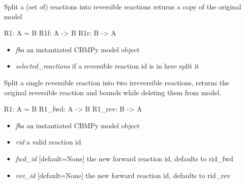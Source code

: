 \documentclass[a4paper,11pt,english]{sphinxmanual}
\begin{document}
\begin{fulllineitems}
\label{modules_doc:cbmpy.CBTools.splitReversibleReactions}
Split a (set of) reactions into reversible reactions returns a copy of the original model

R1: A = B
R1f: A -\textgreater{} B
R1r: B -\textgreater{} A
\begin{itemize}
\item {} 
\emph{fba} an instantiated CBMPy model object

\item {} 
\emph{selected\_reactions} if a reversible reaction id is in here split it

\end{itemize}

\end{fulllineitems}


\begin{fulllineitems}
\label{modules_doc:cbmpy.CBTools.splitSingleReversibleReaction}
Split a single reversible reaction into two irreversible reactions, returns the original reversible reaction and bounds
while deleting them from model.

R1: A = B
R1\_fwd: A -\textgreater{} B
R1\_rev: B -\textgreater{} A
\begin{itemize}
\item {} 
\emph{fba} an instantiated CBMPy model object

\item {} 
\emph{rid} a valid reaction id

\item {} 
\emph{fwd\_id} {[}default=None{]} the new forward reaction id, defaults to rid\_fwd

\item {} 
\emph{rev\_id} {[}default=None{]} the new forward reaction id, defaults to rid\_rev

\end{itemize}

\end{fulllineitems}

\end{document}
